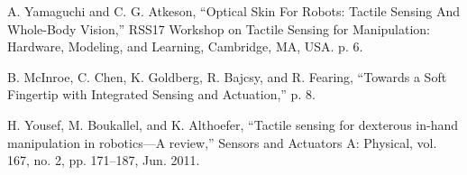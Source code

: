 \documentclass[letterpaper, 12 pt, conference]{ieeeconf}  %
\begin{document}
\begin{thebibliography}{99}
 A. Yamaguchi and C. G. Atkeson, “Optical Skin For Robots: Tactile Sensing And Whole-Body Vision,” RSS17 Workshop on Tactile Sensing for Manipulation: Hardware, Modeling, and Learning, Cambridge, MA, USA. p. 6.

 B. McInroe, C. Chen, K. Goldberg, R. Bajcsy, and R. Fearing, “Towards a Soft Fingertip with Integrated Sensing and Actuation,” p. 8.

 H. Yousef, M. Boukallel, and K. Althoefer, “Tactile sensing for dexterous in-hand manipulation in robotics—A review,” Sensors and Actuators A: Physical, vol. 167, no. 2, pp. 171–187, Jun. 2011.

\end{thebibliography}
\end{document}
